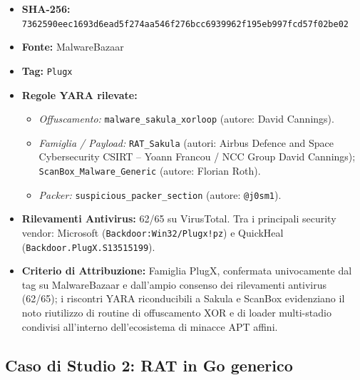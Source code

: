 \documentclass[11pt, a4paper]{article}
\begin{document}
\begin{itemize}
	\item \textbf{SHA-256:} {\small\texttt{7362590eec1693d6ead5f274aa546f276bcc6939962f195eb997fcd57f02be02}}
	\item \textbf{Fonte:} MalwareBazaar
	\item \textbf{Tag:} \texttt{Plugx}
	\item \textbf{Regole YARA rilevate:}
	\begin{itemize}
		\item \textit{Offuscamento:} \texttt{malware\_\allowbreak{}sakula\_\allowbreak{}xorloop} (autore: David Cannings).
		\item \textit{Famiglia / Payload:} \texttt{RAT\_Sakula} (autori: Airbus Defence and Space Cybersecurity CSIRT -- Yoann Francou / NCC Group David Cannings); \texttt{Scan\allowbreak{}Box\_\allowbreak{}Malware\_\allowbreak{}Generic} (autore: Florian Roth).
		\item \textit{Packer:} \texttt{suspicious\_\allowbreak{}packer\_\allowbreak{}section} (autore: \texttt{@j0sm1}).
	\end{itemize}
	\item \textbf{Rilevamenti Antivirus:} 62/65 su VirusTotal. Tra i principali security vendor: Microsoft (\texttt{Backdoor:Win32/\allowbreak{}Plugx!pz}) e QuickHeal (\texttt{Backdoor.\allowbreak{}PlugX.\allowbreak{}S13515199}).
	\item \textbf{Criterio di Attribuzione:} Famiglia PlugX, confermata univocamente dal tag su MalwareBazaar e dall'ampio consenso dei rilevamenti antivirus (62/65); i riscontri YARA riconducibili a Sakula e ScanBox evidenziano il noto riutilizzo di routine di offuscamento XOR e di loader multi-stadio condivisi all'interno dell'ecosistema di minacce APT affini.
\end{itemize}

\subsection{Caso di Studio 2: RAT in Go generico}
\end{document}
